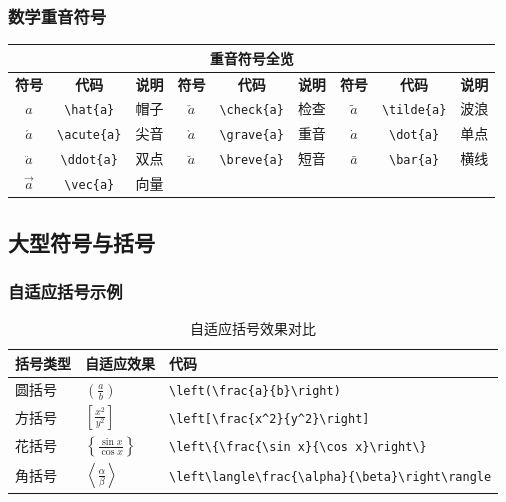 \documentclass{article}
\begin{document}
\subsubsection{数学重音符号}
\begin{center}
\footnotesize
\begin{tabular}{ccc|ccc|ccc}
\hline
\multicolumn{9}{c}{\normalsize\textbf{重音符号全览}} \\
\hline
\textbf{符号} & \textbf{代码} & \textbf{说明} & \textbf{符号} & \textbf{代码} & \textbf{说明} & \textbf{符号} & \textbf{代码} & \textbf{说明} \\
\hline
$\hat{a}$ & \verb|\hat{a}| & 帽子 & $\check{a}$ & \verb|\check{a}| & 检查 & $\tilde{a}$ & \verb|\tilde{a}| & 波浪 \\
$\acute{a}$ & \verb|\acute{a}| & 尖音 & $\grave{a}$ & \verb|\grave{a}| & 重音 & $\dot{a}$ & \verb|\dot{a}| & 单点 \\
$\ddot{a}$ & \verb|\ddot{a}| & 双点 & $\breve{a}$ & \verb|\breve{a}| & 短音 & $\bar{a}$ & \verb|\bar{a}| & 横线 \\
$\vec{a}$ & \verb|\vec{a}| & 向量 & & & & & & \\
\hline
\end{tabular}
\end{center}

\subsection{大型符号与括号}

\subsubsection{自适应括号示例}
\begin{table}[h]
\centering
\begin{tabular}{>{\centering}p{4cm}>{\centering}p{6cm}>{\centering\arraybackslash}p{4cm}}
\hline
\textbf{括号类型} & \textbf{自适应效果} & \textbf{代码} \\
\hline
圆括号 & $\left(\frac{a}{b}\right)$ & \verb|\left(\frac{a}{b}\right)| \\
\hline
方括号 & $\left[\frac{x^2}{y^2}\right]$ & \verb|\left[\frac{x^2}{y^2}\right]| \\
\hline
花括号 & $\left\{\frac{\sin x}{\cos x}\right\}$ & \verb|\left\{\frac{\sin x}{\cos x}\right\}| \\
\hline
角括号 & $\left\langle\frac{\alpha}{\beta}\right\rangle$ & \verb|\left\langle\frac{\alpha}{\beta}\right\rangle| \\
\hline
\end{tabular}
\caption{自适应括号效果对比}
\end{table}
\end{document}

